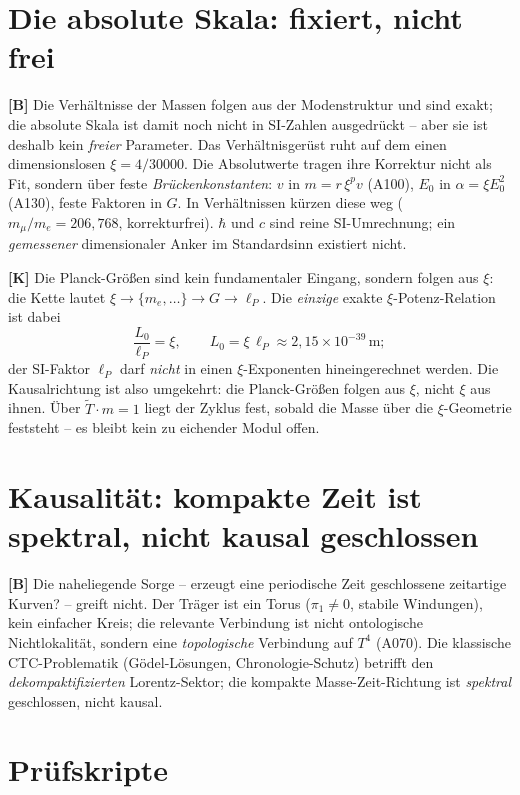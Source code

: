 \section{Die absolute Skala: fixiert, nicht frei}

\textbf{[B]} Die Verhältnisse der Massen folgen aus der Modenstruktur und sind
exakt; die absolute Skala ist damit noch nicht in SI-Zahlen ausgedrückt -- aber
sie ist deshalb kein \emph{freier} Parameter. Das Verhältnisgerüst ruht auf dem
einen dimensionslosen $\xi=4/30000$. Die Absolutwerte tragen ihre Korrektur nicht
als Fit, sondern über feste \emph{Brückenkonstanten}: $v$ in $m=r\,\xi^{p}v$
(A100), $E_0$ in $\alpha=\xi E_0^2$ (A130), feste Faktoren in $G$. In Verhältnissen
kürzen diese weg ($m_\mu/m_e=206{,}768$, korrekturfrei). $\hbar$ und $c$ sind reine
SI-Umrechnung; ein \emph{gemessener} dimensionaler Anker im Standardsinn existiert
nicht.

\textbf{[K]} Die Planck-Größen sind kein fundamentaler Eingang, sondern folgen aus
$\xi$: die Kette lautet $\xi\to\{m_e,\dots\}\to G\to\ell_P$. Die \emph{einzige}
exakte $\xi$-Potenz-Relation ist dabei
\[
  \frac{L_0}{\ell_P} = \xi,\qquad L_0 = \xi\,\ell_P \approx 2{,}15\times10^{-39}\,\text{m};
\]
der SI-Faktor $\ell_P$ darf \emph{nicht} in einen $\xi$-Exponenten hineingerechnet
werden. Die Kausalrichtung ist also umgekehrt: die Planck-Größen folgen aus $\xi$,
nicht $\xi$ aus ihnen. Über $\tilde T\cdot m=1$ liegt der Zyklus fest, sobald die
Masse über die $\xi$-Geometrie feststeht -- es bleibt kein zu eichender Modul
offen.

\section{Kausalität: kompakte Zeit ist spektral, nicht kausal geschlossen}

\textbf{[B]} Die naheliegende Sorge -- erzeugt eine periodische Zeit geschlossene
zeitartige Kurven? -- greift nicht. Der Träger ist ein Torus ($\pi_1\neq0$, stabile
Windungen), kein einfacher Kreis; die relevante Verbindung ist nicht ontologische
Nichtlokalität, sondern eine \emph{topologische} Verbindung auf $T^4$ (A070). Die
klassische CTC-Problematik (Gödel-Lösungen, Chronologie-Schutz) betrifft den
\emph{dekompaktifizierten} Lorentz-Sektor; die kompakte Masse-Zeit-Richtung ist
\emph{spektral} geschlossen, nicht kausal.

\section{Prüfskripte}

